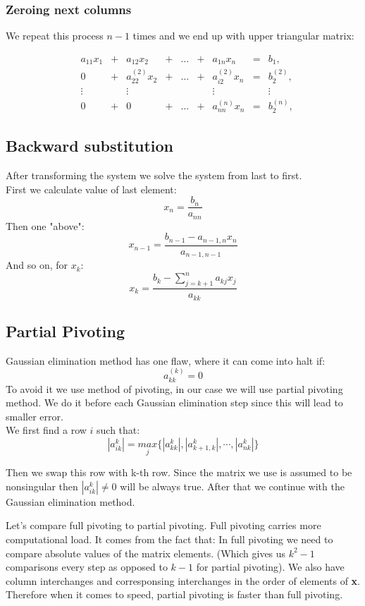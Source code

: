 \documentclass[12pt]{report}
\begin{document}
\subsubsection{Zeroing next columns}
We repeat this process $n-1$ times and we end up with upper triangular matrix:

\[
\begin{matrix}

&a_{11}x_1 &{}+&a_{12}x_2&+&\dots&+&a_{1n}x_n &=&b_1,\\

&0 &{}+& a_{22}^{(2)}x_2&{}+&\dots&{}+& a_{i2}^{(2)}x_n &=&b_2^{(2)},\\

&\vdots    &&\vdots      & &     & &  \vdots  & &\vdots\\

&0 &{}+& 0 &{}+&\dots&{}+& a_{nn}^{(n)}x_n &=&b_2^{(n)},

\end{matrix}
\]

\subsection{Backward substitution}
After transforming the system we solve the system from last to first. \\
First we calculate value of last element:
\[ x_n = \frac{b_n}{a_{nn}} \]
Then one "above":
\[ x_{n-1} = \frac{ b_{n-1} - a_{n-1, n}x_n}{a_{n-1, n-1}} \]
And so on, for $x_k$:
\[ x_{k} = \frac{b_k - \sum_{j = k + 1}^n a_{kj}x_j}{a_{kk}} \]

\newpage
\subsection{Partial Pivoting}
Gaussian elimination method has one flaw, where it can come into halt if:
\[ a_{kk}^{(k)} = 0 \]
To avoid it we use method of pivoting, in our case we will use partial pivoting method.
We do it before each Gaussian elimination step since this will lead to smaller error.
\\We first find a row $i$ such that:
\[ |{a_{ik}^{k}}| = \underset{j}{max} \{ |{a_{kk}^{k}}|, |{a_{k+1, k}^{k}}|, \cdots, |{a_{nk}^{k}}|\} \]

Then we swap this row with k-th row. Since the matrix we use is assumed to be nonsingular then $|{a_{ik}^{k}}| \neq 0$ will be always true. After that we continue with the Gaussian elimination method.

Let's compare full pivoting to partial pivoting.
Full pivoting carries more computational load. It comes from the fact that:
In full pivoting we need to compare absolute values of the matrix elements. (Which gives us $ k^2-1$ comparisons every step as opposed to $k-1$ for partial pivoting). We also have column interchanges and corresponsing interchanges in the order of elements of \textbf{x}.
Therefore when it comes to speed, partial pivoting is faster than full pivoting.
\end{document}
